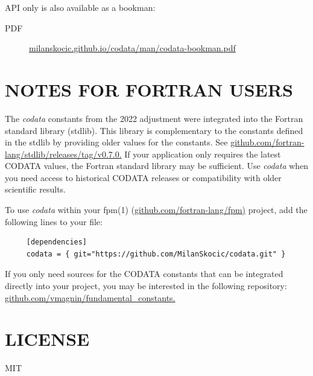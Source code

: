 API only is also available as a bookman:
\begin{description}
\item[PDF] \href{https://milanskocic.github.io/codata/man/codata-bookman.pdf}{milanskocic.github.io/codata/man/codata-bookman.pdf} 
\end{description}

\section*{NOTES FOR FORTRAN USERS}
The \emph{codata} constants from the 2022 adjustment were integrated into the Fortran 
standard library (stdlib).
This library is complementary to the constants defined in the stdlib
by providing older values for the constants.
See \href{https://github.com/fortran-lang/stdlib/releases/tag/v0.7.0}{github.com/fortran-lang/stdlib/releases/tag/v0.7.0.} 
If your application only requires the latest CODATA values, the
Fortran standard library may be sufficient. Use \emph{codata} when you need
access to historical CODATA releases or compatibility with older
scientific results.
  
To use \emph{codata} within your fpm(1) (\href{https://github.com/fortran-lang/fpm}{github.com/fortran-lang/fpm)} 
project, add the following lines to your file:

\begin{verbatim}
     [dependencies]
     codata = { git="https://github.com/MilanSkocic/codata.git" }

\end{verbatim}
If you only need sources for the CODATA constants that can be 
integrated directly into your project, you may be interested in the 
following repository:
\href{https://github.com/vmagnin/fundamental\_constants}{github.com/vmagnin/fundamental\_constants.} 

\section*{LICENSE}
MIT
